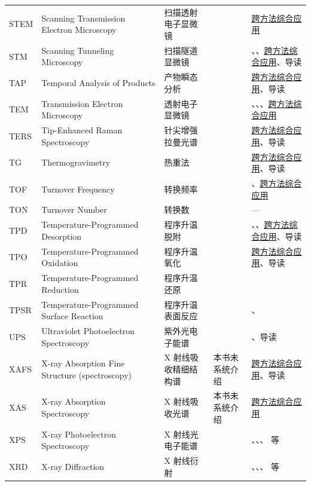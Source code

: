 {\begin{xltabular}{\textwidth}{@{}p{14mm}X p{40mm}p{20mm}p{34mm}@{}}
STEM & Scanning Transmission Electron Microscopy & 扫描透射电子显微镜 &  & \hyperref[ch:13-synthesis]{跨方法综合应用} \\
STM & Scanning Tunneling Microscopy & 扫描隧道显微镜 &  & 、、\hyperref[ch:13-synthesis]{跨方法综合应用}、导读 \\
TAP & Temporal Analysis of Products & 产物瞬态分析 &  & \hyperref[ch:13-synthesis]{跨方法综合应用}、导读 \\
TEM & Transmission Electron Microscopy & 透射电子显微镜 &  & 、、、\hyperref[ch:13-synthesis]{跨方法综合应用} \\
TERS & Tip-Enhanced Raman Spectroscopy & 针尖增强拉曼光谱 &  & \hyperref[ch:13-synthesis]{跨方法综合应用}、导读 \\
TG & Thermogravimetry & 热重法 &  & \hyperref[ch:13-synthesis]{跨方法综合应用}、导读 \\
TOF & Turnover Frequency & 转换频率 &  & 、\hyperref[ch:13-synthesis]{跨方法综合应用} \\
TON & Turnover Number & 转换数 &  & — \\
TPD & Temperature-Programmed Desorption & 程序升温脱附 &  & 、、\hyperref[ch:13-synthesis]{跨方法综合应用}、导读 \\
TPO & Temperature-Programmed Oxidation & 程序升温氧化 &  & \hyperref[ch:13-synthesis]{跨方法综合应用}、导读 \\
TPR & Temperature-Programmed Reduction & 程序升温还原 &  &  \\
TPSR & Temperature-Programmed Surface Reaction & 程序升温表面反应 &  & 、 \\
UPS & Ultraviolet Photoelectron Spectroscopy & 紫外光电子能谱 &  & 、导读 \\
XAFS & X-ray Absorption Fine Structure (spectroscopy) & X 射线吸收精细结构谱 & 本书未系统介绍 & \hyperref[ch:13-synthesis]{跨方法综合应用}、导读 \\
XAS & X-ray Absorption Spectroscopy & X 射线吸收光谱 & 本书未系统介绍 & \hyperref[ch:13-synthesis]{跨方法综合应用} \\
XPS & X-ray Photoelectron Spectroscopy & X 射线光电子能谱 &  & 、、、 等 \\
XRD & X-ray Diffraction & X 射线衍射 &  & 、、、 等 \\
\end{xltabular}}

